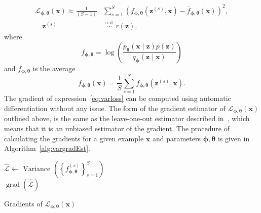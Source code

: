 \begin{equation}
	\label{eq:varloss}
	\begin{aligned}
		\mathcal{L}_{\boldsymbol{\phi}, \boldsymbol{\theta}}(\mathbf{x}) \approx \frac{1}{(S-1)} &\sum_{s=1}^{S}\left(f_{\boldsymbol{\phi},\boldsymbol{\theta}}(\mathbf{z}^{(s)}, \mathbf{x})-\bar{f}_{\boldsymbol{\phi},\boldsymbol{\theta}}(\mathbf{x})\right)^{2}, \\
		\quad \mathbf{z}^{(s)} &\stackrel{\text { i.i.d. }}{\sim} r(\mathbf{z}),
	\end{aligned}
\end{equation}
where
\begin{equation}
	f_{\boldsymbol{\phi},\boldsymbol{\theta}} = \log \left(\frac{p_{\boldsymbol{\theta}}(\mathbf{x} \mid \mathbf{z}) p(\mathbf{z})}{q_{\boldsymbol{\phi}}(\mathbf{z} \mid \mathbf{x})}\right)
\end{equation}
and $f_{\boldsymbol{\phi},\boldsymbol{\theta}}$ is the average
\begin{equation}
	\bar{f}_{\boldsymbol{\phi},\boldsymbol{\theta}}(\mathbf{x})=\frac{1}{S} \sum_{s=1}^{S} f_{\boldsymbol{\phi},\boldsymbol{\theta}}\left(\mathbf{z}^{(s)},  \mathbf{x}\right).
\end{equation}
The gradient of expression~\eqref{eq:varloss} can be computed using automatic differentiation without any issue. The form of the gradient estimator of $\mathcal{L}_{\boldsymbol{\phi}, \boldsymbol{\theta}}(\mathbf{x})$ outlined above, is the same as the leave-one-out estimator described in~\cite{richter2020vargrad}, which means that it is an unbiased estimator of the gradient. The procedure of calculating the gradients for a given example $\mathbf{x}$ and parameters $\boldsymbol{\phi}, \boldsymbol{\theta}$ is given in Algorithm~\ref{alg:vargradEst}.
\begin{algorithm}[ht]
	\SetAlgoLined
	$\widehat{\mathcal{L}} \leftarrow \text { Variance }\left(\left\{f_{\boldsymbol{\phi}, \boldsymbol{\theta}}^{(s)}\right\}_{s=1}^{S}\right)$ \\
	
	\Return $\operatorname{grad}\left(\widehat{\mathcal{L}}\right)$
	\caption{\label{alg:vargradEst}Gradients of $\mathcal{L}_{\boldsymbol{\boldsymbol{\phi}}, \boldsymbol{\theta}}(\mathbf{x})$}
\end{algorithm}
